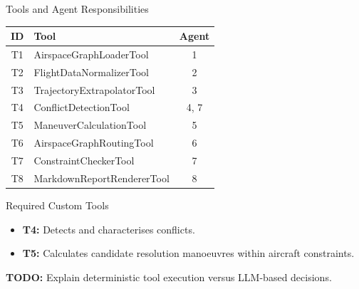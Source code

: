 

\begin{frame}{Tools and Agent Responsibilities}

\scriptsize

\begin{table}
\centering
\begin{tabular}{clc}
\toprule
\textbf{ID} & \textbf{Tool} & \textbf{Agent} \\
\midrule
T1 & AirspaceGraphLoaderTool & 1 \\
T2 & FlightDataNormalizerTool & 2 \\
T3 & TrajectoryExtrapolatorTool & 3 \\
T4 & ConflictDetectionTool & 4, 7 \\
T5 & ManeuverCalculationTool & 5 \\
T6 & AirspaceGraphRoutingTool & 6 \\
T7 & ConstraintCheckerTool & 7 \\
T8 & MarkdownReportRendererTool & 8 \\
\bottomrule
\end{tabular}
\end{table}

\vspace{0.25cm}

\begin{block}{Required Custom Tools}
\begin{itemize}
    \item \textbf{T4:} Detects and characterises conflicts.
    \item \textbf{T5:} Calculates candidate resolution
    manoeuvres within aircraft constraints.
\end{itemize}
\end{block}

\begin{center}
\small
\textbf{TODO:} Explain deterministic tool
execution versus LLM-based decisions.
\end{center}

\end{frame}
